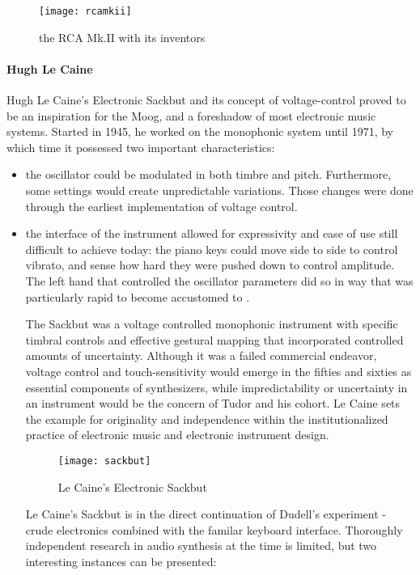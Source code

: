 	\begin{figure}[h!]
	  \caption{the RCA Mk.II with its inventors}
	  \centering
	    \texttt{[image: rcamkii]}
	\end{figure}

\paragraph{Hugh Le Caine}

Hugh Le Caine’s Electronic Sackbut and its concept of voltage-control proved to be an inspiration for the Moog, and a foreshadow of most electronic music systems. Started in 1945, he worked on the monophonic system until 1971, by which time it possessed two important characteristics: 
\begin{itemize}
	\item the oscillator could be modulated in both timbre and pitch. Furthermore, some settings would create unpredictable variations. Those changes were done through the earliest implementation of voltage control. 
	\item the interface of the instrument allowed for expressivity and ease of use still difficult to achieve today: the piano keys could move side to side to control vibrato, and sense how hard they were pushed down to control amplitude. The left hand that controlled the oscillator parameters did so in way that was particularly rapid to become accustomed to \citep{holmes2002}. 
	
	The Sackbut was a voltage controlled monophonic instrument with specific timbral controls and effective gestural mapping that incorporated controlled amounts of uncertainty. Although it was a failed commercial endeavor, voltage control and touch-sensitivity would emerge in the fifties and sixties as essential components of synthesizers, while impredictability or uncertainty in an instrument would be the concern of Tudor and his cohort. Le Caine sets the example for originality and independence within the institutionalized practice of electronic music and electronic instrument design\cite[p.147]{holmes2002}. 

	\begin{figure}[h!]
	  \caption{Le Caine's Electronic Sackbut}
	  \centering
	    \texttt{[image: sackbut]}
	\end{figure}

Le Caine's Sackbut is in the direct continuation of Dudell's experiment - crude electronics combined with the familar keyboard interface. Thoroughly independent research in audio synthesis at the time is limited, but two interesting instances can be presented: 


\end{itemize}
